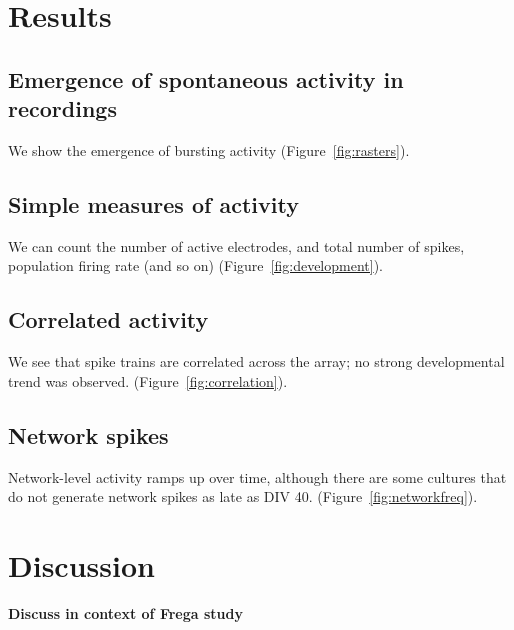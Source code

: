 \documentclass{bmcart}
\begin{document}
\section*{Results}

\subsection*{Emergence of spontaneous activity in recordings}
We show the emergence of bursting activity (Figure~\ref{fig:rasters}).

\subsection*{Simple measures of activity}
We can count the number of active electrodes, and total number of
spikes, population firing rate (and so on)
(Figure~\ref{fig:development}).

\subsection*{Correlated activity}
We see that spike trains are correlated across the array; no
strong developmental trend was observed.
(Figure~\ref{fig:correlation}).

\subsection*{Network spikes}
Network-level activity ramps up over time, although there are some
cultures that do not generate network spikes as late as DIV 40.
(Figure~\ref{fig:networkfreq}).

\section*{Discussion}
\textbf{Discuss in context of Frega study}  \cite{Frega2019}
\vspace*{1cm}
\end{document}
